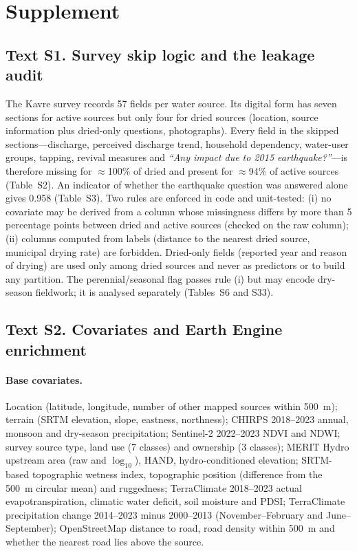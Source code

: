 
\section*{Supplement}
\renewcommand{\thetable}{S\arabic{table}}
\setcounter{table}{0}

\subsection*{Text S1. Survey skip logic and the leakage audit}
The Kavre survey records 57 fields per water source. Its digital form has seven sections for active sources but only four for dried sources (location, source information plus dried-only questions, photographs). Every field in the skipped sections---discharge, perceived discharge trend, household dependency, water-user groups, tapping, revival measures and \emph{``Any impact due to 2015 earthquake?''}---is therefore missing for $\approx$100\% of dried and present for $\approx$94\% of active sources (Table~S2). An indicator of whether the earthquake question was answered alone gives \auc{} 0.958 (Table~S3). Two rules are enforced in code and unit-tested: (i) no covariate may be derived from a column whose missingness differs by more than 5 percentage points between dried and active sources (checked on the raw column); (ii) columns computed from labels (distance to the nearest dried source, municipal drying rate) are forbidden. Dried-only fields (reported year and reason of drying) are used only among dried sources and never as predictors or to build any partition. The perennial/seasonal flag passes rule (i) but may encode dry-season fieldwork; it is analysed separately (Tables~S6 and S33).

\subsection*{Text S2. Covariates and Earth Engine enrichment}
\paragraph{Base covariates.} Location (latitude, longitude, number of other mapped sources within \SI{500}{\metre}); terrain (SRTM elevation, slope, eastness, northness); CHIRPS 2018--2023 annual, monsoon and dry-season precipitation; Sentinel-2 2022--2023 NDVI and NDWI; survey source type, land use (7 classes) and ownership (3 classes); MERIT Hydro upstream area (raw and $\log_{10}$), HAND, hydro-conditioned elevation; SRTM-based topographic wetness index, topographic position (difference from the \SI{500}{\metre} circular mean) and ruggedness; TerraClimate 2018--2023 actual evapotranspiration, climatic water deficit, soil moisture and PDSI; TerraClimate precipitation change 2014--2023 minus 2000--2013 (November--February and June--September); OpenStreetMap distance to road, road density within \SI{500}{\metre} and whether the nearest road lies above the source.


